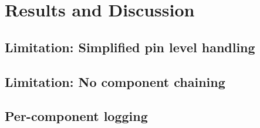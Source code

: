 
\chapter{Results and Discussion} \label{chapter:results}

\section{Limitation: Simplified pin level handling}


\section{Limitation: No component chaining}

\section{Per-component logging}

